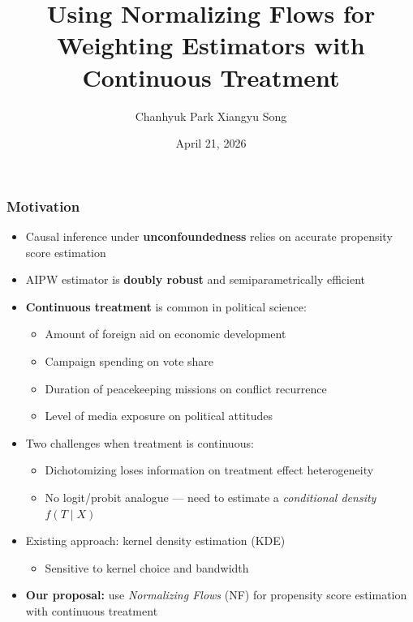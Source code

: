 \documentclass[10pt, handout]{beamer}
\title[AIPW\_NF]{Using Normalizing Flows for Weighting Estimators with Continuous Treatment}
\author[Park and Song]{Chanhyuk Park \quad Xiangyu Song}
\institute{Washington University in St. Louis}
\date{April 21, 2026}
\begin{document}
\maketitle

\begin{frame}
  \frametitle{Motivation}

  \begin{itemize}
    \item Causal inference under \textbf{unconfoundedness} relies on accurate propensity score estimation
    \item AIPW estimator is \textbf{doubly robust} and semiparametrically efficient
    \item \textbf{Continuous treatment} is common in political science:
    \begin{itemize}
      \item Amount of foreign aid on economic development
      \item Campaign spending on vote share
      \item Duration of peacekeeping missions on conflict recurrence
      \item Level of media exposure on political attitudes
    \end{itemize}
    \item Two challenges when treatment is continuous:
    \begin{itemize}
      \item Dichotomizing loses information on treatment effect heterogeneity
      \item No logit/probit analogue --- need to estimate a \textit{conditional density} $f(T \mid X)$
    \end{itemize}
    \item Existing approach: kernel density estimation (KDE)
    \begin{itemize}
      \item Sensitive to kernel choice and bandwidth
    \end{itemize}
    \item \textbf{Our proposal:} use \textit{Normalizing Flows} (NF) for propensity score estimation with continuous treatment
  \end{itemize}

\end{frame}
\end{document}
